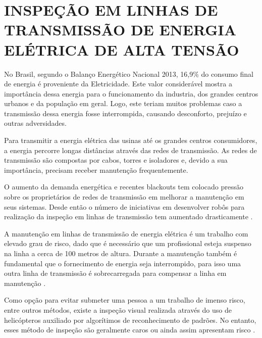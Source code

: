 \documentclass[12pt,oneside,a4paper, chapter=TITLE, section = TITLE, english, brazil]{abntex2}
\begin{document}

\section{INSPEÇÃO EM LINHAS DE TRANSMISSÃO DE ENERGIA ELÉTRICA DE ALTA TENSÃO} %

No Brasil, segundo o Balanço Energético Nacional 2013, 16,9\% do consumo final de energia é proveniente da Eletricidade. Este valor considerável mostra a importância dessa energia para o funcionamento da industria, dos grandes centros urbanos e da população em geral. Logo, este teriam muitos problemas caso a transmissão dessa energia fosse interrompida, causando desconforto, prejuízo e outras adversidades.

Para transmitir a energia elétrica das usinas até os grandes centros consumidores, a energia percorre longas distâncias através das redes de transmissão. As redes de transmissão são compostas por cabos, torres e isoladores e, devido a sua importância, precisam receber manutenção frequentemente.

O aumento da demanda energética e recentes blackouts tem colocado pressão sobre os proprietários de redes de transmissão em melhorar a manutenção em seus sistemas. Desde então o número de iniciativas em desenvolver robôs para realização da inspeção em linhas de transmissão tem aumentado drasticamente \cite{transmission}.

A manutenção em linhas de transmissão de energia elétrica é um trabalho com elevado grau de risco, dado que é necessário que um profissional esteja suspenso na linha a cerca de 100 metros de altura. Durante a manutenção também é fundamental que o fornecimento de energia seja interrompido, para isso uma outra linha de transmissão é sobrecarregada para compensar a linha em manutenção \cite{expliner}.

Como opção para evitar submeter uma pessoa a um trabalho de imenso risco, entre outros métodos, existe a inspeção visual realizada através do uso de helicópteros auxiliado por algorítimos de reconhecimento de padrões. No entanto, esses método de inspeção são geralmente caros ou ainda assim apresentam risco .
\end{document}
